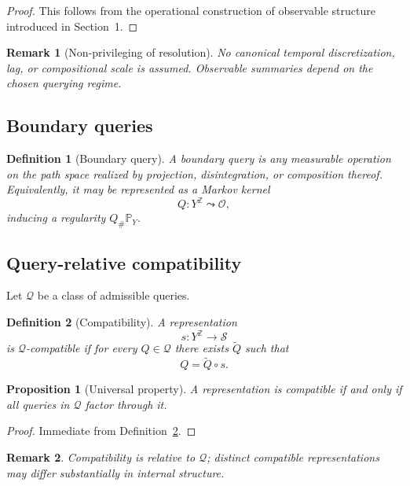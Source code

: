 \documentclass[11pt]{article}
\newtheorem{definition}{Definition}
\newtheorem{proposition}{Proposition}
\newtheorem{remark}{Remark}
\begin{document}
\begin{proof}
This follows from the operational construction of observable structure
introduced in Section~1.
\end{proof}

\begin{remark}[Non-privileging of resolution]
No canonical temporal discretization, lag, or compositional scale is assumed.
Observable summaries depend on the chosen querying regime.
\end{remark}

\subsection{Boundary queries}

\begin{definition}[Boundary query]\label{def:boundary-query}
A boundary query is any measurable operation on the path space
realized by projection, disintegration, or composition thereof.
Equivalently, it may be represented as a Markov kernel
\[
Q:Y^{\mathbb Z}\leadsto \mathcal O,
\]
inducing a regularity $Q_\#\mathbb P_Y$.
\end{definition}

\subsection{Query-relative compatibility}

Let $\mathcal Q$ be a class of admissible queries.

\begin{definition}[Compatibility]\label{def:query-compatibility}
A representation
\[
s:Y^{\mathbb Z}\to \mathcal S
\]
is $\mathcal Q$-compatible if for every $Q\in\mathcal Q$ there exists
$\widetilde Q$ such that
\[
Q=\widetilde Q\circ s.
\]
\end{definition}

\begin{proposition}[Universal property]\label{prop:compat-universal}
A representation is compatible if and only if all queries in $\mathcal Q$
factor through it.
\end{proposition}

\begin{proof}
Immediate from Definition~\ref{def:query-compatibility}.
\end{proof}

\begin{remark}
Compatibility is relative to $\mathcal Q$; distinct compatible representations
may differ substantially in internal structure.
\end{remark}
\end{document}
